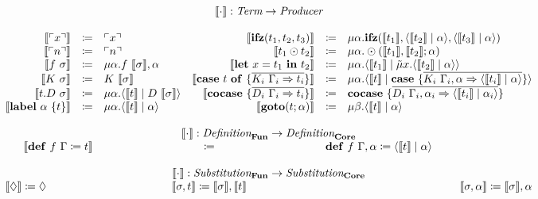 \[
  \begin{array}{rcl rcl}
    \multicolumn{6}{c}{\translate{\cdot} : \emph{Term} \rightarrow \emph{Producer}}\\
    \\
    \translate{\lit{x}} & \coloneq & \lit{x} &
    \translate{\ifz{t_1}{t_2}{t_3}} & \coloneq & \mu\alpha.\ifz{\translate{t_1}}{\cut{\translate{t_2}}{\alpha}}{\cut{\translate{t_3}}{\alpha}} \\
    \translate{\lit{n}} & \coloneq & \lit{n}  &
    \translate{t_1 \odot t_2} & \coloneq & \mu\alpha.\odot(\translate{t_1}, \translate{t_2}; \alpha)  \\
    \translate{f\ \sigma} & \coloneq & \mu\alpha.f\ \translate{\sigma}, \alpha  &
    \translate{\letin{x}{t_1}{t_2}} & \coloneq & \mu\alpha.\cut{\translate{t_1}}{\tilde{\mu}x.\cut{\translate{t_2}}{\alpha}} \\
    \translate{K\ \sigma} & \coloneq & K\ \translate{\sigma} &
    \translate{\caseof{t}{\overline{K_i\ \Gamma_i \Rightarrow t_i}}} & \coloneq & \mu\alpha.\cut{\translate{t}}{\case{\overline{K_i\ \Gamma_i,\alpha \Rightarrow \cut{\translate{t_i}}{\alpha}}}}  \\
    \translate{t.D\ \sigma} & \coloneq & \mu\alpha.\cut{\translate{t}}{D\ \translate{\sigma}}   &
    \translate{\cocase{\overline{D_i\ \Gamma_i \Rightarrow t_i}}} & \coloneq & \cocase{\overline{D_i\ \Gamma_i,\alpha_i \Rightarrow \cut{\translate{t_i}}{\alpha_i}}}  \\
    \translate{\lab{\alpha}{t}} & \coloneq & \mu\alpha.\cut{\translate{t}}{\alpha} &
    \translate{\goto{t}{\alpha}} & \coloneq & \mu\beta.\cut{\translate{t}}{\alpha}  \\
    \\
    \multicolumn{6}{c}{\translate{\cdot{}}{} : \emph{Definition}_{\surfacelang{}} \rightarrow \emph{Definition}_{\targetlang{}}}\\
    \multicolumn{2}{r}{\translate{\defi{f\ \Gamma}{t}}{}} & \multicolumn{2}{c}{\coloneq} & \multicolumn{2}{l}{\defi{f\ \Gamma, \alpha}{\cut{\translate{t}}{\alpha}}} \\
    \\
    \multicolumn{6}{c}{\translate{\cdot{}}{}:\emph{Substitution}_{\surfacelang{}}\rightarrow\emph{Substitution}_{\targetlang{}}}\\
    \multicolumn{2}{l}{\translate{\nil} \coloneq \nil} &
    \multicolumn{2}{c}{\translate{\sigma,t} \coloneq \translate{\sigma},\translate{t}} &
    \multicolumn{2}{r}{\translate{\sigma,\alpha} \coloneq \translate{\sigma},\alpha}\\
    \\
  \end{array}
\]
